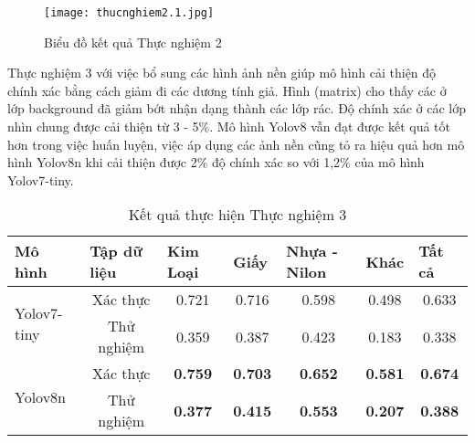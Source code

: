 \documentclass[../the.tex]{subfiles}
\begin{document}
\begin{figure}[H]
    \centering
    \texttt{[image: thucnghiem2.1.jpg]}
    \caption{Biểu đồ kết quả Thực nghiệm 2}
    \label{fig:thucnghiem2}
\end{figure}

{\fontsize{13}{12} \selectfont 
Thực nghiệm 3 với việc bổ sung các hình ảnh nền giúp mô hình cải thiện độ chính xác bằng cách giảm đi các dương tính giả. Hình (matrix) cho thấy các ở lớp background đã giảm bớt nhận dạng thành các lớp rác.
Độ chính xác ở các lớp nhìn chung được cải thiện từ 3 - 5\%. Mô hình Yolov8 vẫn đạt được kết quả tốt hơn trong việc huấn luyện, việc áp dụng các ảnh nền cũng tỏ ra hiệu quả hơn mô hình Yolov8n khi cải thiện được 2\% độ chính xác so với 1,2\% của mô hình Yolov7-tiny.
}

\begin{table}[h!]
    \centering
    \caption{Kết quả thực hiện Thực nghiệm 3}
    \begin{tabular}{|l|c|c|c|c|c|c|}
        \hline
        \textbf{Mô hình}             & \multicolumn{1}{l|}{\textbf{Tập dữ liệu}} & \multicolumn{1}{l|}{\textbf{Kim Loại}} & \multicolumn{1}{l|}{\textbf{Giấy}} & \multicolumn{1}{l|}{\textbf{Nhựa - Nilon}} & \multicolumn{1}{l|}{\textbf{Khác}} & \multicolumn{1}{l|}{Tất cả} \\ \hline
        \multirow{2}{*}{Yolov7-tiny} & Xác thực                                  & 0.721                                  & 0.716                              & 0.598                                      & 0.498                              & 0.633                       \\ \cline{2-7} 
                                     & Thử nghiệm                                & 0.359                                  & 0.387                              & 0.423                                      & 0.183                              & 0.338                       \\ \hline
        \multirow{2}{*}{Yolov8n}     & Xác thực                                  & \textbf{0.759}                         & \textbf{0.703}                     & \textbf{0.652}                             & \textbf{0.581}                     & \textbf{0.674}              \\ \cline{2-7} 
                                     & Thử nghiệm                                & \textbf{0.377}                         & \textbf{0.415}                     & \textbf{0.553}                             & \textbf{0.207}                     & \textbf{0.388}              \\ \hline
        \end{tabular}
    \label{tab:thucnghiem3.1}
\end{table}
\end{document}
